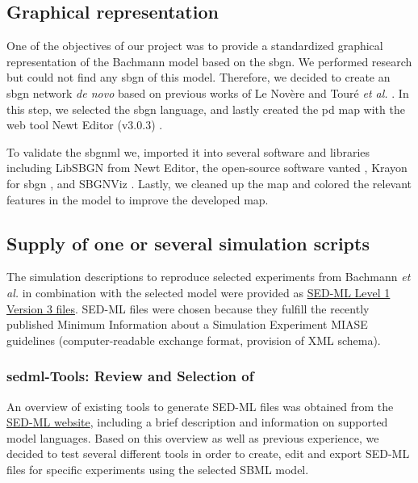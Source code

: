 \subsection*{Graphical representation}
One of the objectives of our project was to provide a standardized graphical representation of the Bachmann model based on the \ac{sbgn}. We performed research but could not find any \ac{sbgn} of this model. Therefore, we decided to create an \ac{sbgn} network \textit{de novo} based on previous works of Le Novère \cite{sbgnnovere} and Touré \textit{et al.} \cite{sbgntoure}. In this step, we selected the \ac{sbgn} language, and lastly created the \ac{pd} map with the web tool Newt Editor (v3.0.3) \cite{newteditor}. 

To validate the \ac{sbgnml} we, imported it into several software and libraries including LibSBGN from Newt Editor, the open-source software \ac{vanted} \cite{vanted}, Krayon for \ac{sbgn} \cite{krayon}, and SBGNViz \cite{sbgnviz}. Lastly, we cleaned up the map and colored the relevant features in the model to improve the developed map.

\subsection*{Supply of one or several simulation scripts}
The simulation descriptions to reproduce selected experiments from Bachmann \textit{et al.} \cite{bachmannmodel} in combination with the selected model were provided as \hyperlink{https://sed-ml.org/}{SED-ML Level 1 Version 3 files}. SED-ML files were chosen because they fulfill
the recently published Minimum Information about a Simulation Experiment \ac{MIASE} guidelines (computer-readable exchange format, provision of XML schema).

\subsubsection*{\acs{sedml}-Tools: Review and Selection of }
An overview of existing tools to generate SED-ML files was obtained from the \hyperlink{http://sed-ml.org/}{SED-ML website}, including a brief description and information on supported model languages. Based on this overview as well as previous experience, we decided to test several different tools in order to create, edit and export SED-ML files for specific experiments using the selected SBML model. 

